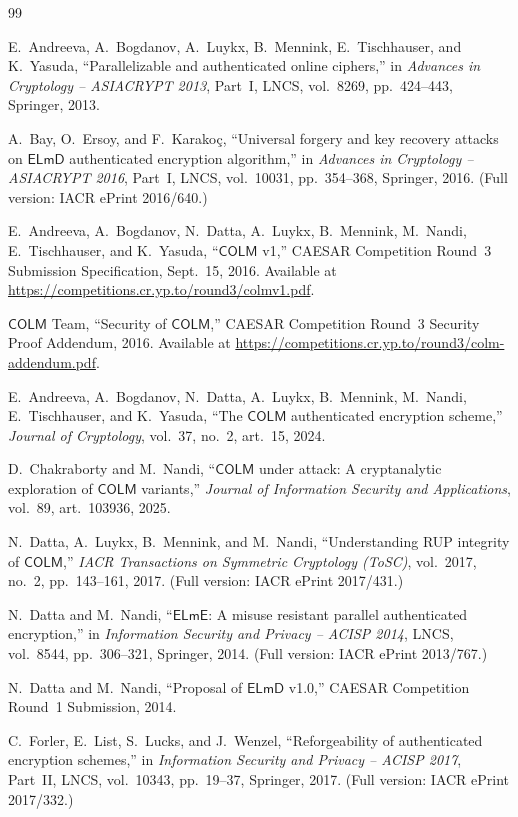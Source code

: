 \documentclass[11pt,a4paper]{article}
\theoremstyle{definition}
\theoremstyle{remark}
\newcommand{\COLM}{\mathsf{COLM}}
\newcommand{\ELmE}{\mathsf{ELmE}}
\newcommand{\ELmD}{\mathsf{ELmD}}
\begin{document}
\begin{thebibliography}{99}

E.~Andreeva, A.~Bogdanov, A.~Luykx, B.~Mennink, E.~Tischhauser, and K.~Yasuda,
``Parallelizable and authenticated online ciphers,'' in \emph{Advances in Cryptology -- ASIACRYPT 2013}, Part~I, LNCS, vol.~8269, pp.~424--443, Springer, 2013.

A.~Bay, O.~Ersoy, and F.~Karako\c{c},
``Universal forgery and key recovery attacks on $\ELmD$ authenticated encryption algorithm,'' in \emph{Advances in Cryptology -- ASIACRYPT 2016}, Part~I, LNCS, vol.~10031, pp.~354--368, Springer, 2016. (Full version: IACR ePrint 2016/640.)

E.~Andreeva, A.~Bogdanov, N.~Datta, A.~Luykx, B.~Mennink, M.~Nandi, E.~Tischhauser, and K.~Yasuda,
``$\COLM$ v1,'' CAESAR Competition Round~3 Submission Specification, Sept.~15, 2016. Available at \url{https://competitions.cr.yp.to/round3/colmv1.pdf}.

$\COLM$ Team,
``Security of $\COLM$,'' CAESAR Competition Round~3 Security Proof Addendum, 2016. Available at \url{https://competitions.cr.yp.to/round3/colm-addendum.pdf}.

E.~Andreeva, A.~Bogdanov, N.~Datta, A.~Luykx, B.~Mennink, M.~Nandi, E.~Tischhauser, and K.~Yasuda,
``The $\COLM$ authenticated encryption scheme,'' \emph{Journal of Cryptology}, vol.~37, no.~2, art.~15, 2024.

D.~Chakraborty and M.~Nandi,
``$\COLM$ under attack: A cryptanalytic exploration of $\COLM$ variants,'' \emph{Journal of Information Security and Applications}, vol.~89, art.~103936, 2025.

N.~Datta, A.~Luykx, B.~Mennink, and M.~Nandi,
``Understanding RUP integrity of $\COLM$,'' \emph{IACR Transactions on Symmetric Cryptology (ToSC)}, vol.~2017, no.~2, pp.~143--161, 2017. (Full version: IACR ePrint 2017/431.)

N.~Datta and M.~Nandi,
``$\ELmE$: A misuse resistant parallel authenticated encryption,'' in \emph{Information Security and Privacy -- ACISP 2014}, LNCS, vol.~8544, pp.~306--321, Springer, 2014. (Full version: IACR ePrint 2013/767.)

N.~Datta and M.~Nandi,
``Proposal of $\ELmD$ v1.0,'' CAESAR Competition Round~1 Submission, 2014.

C.~Forler, E.~List, S.~Lucks, and J.~Wenzel,
``Reforgeability of authenticated encryption schemes,'' in \emph{Information Security and Privacy -- ACISP 2017}, Part~II, LNCS, vol.~10343, pp.~19--37, Springer, 2017. (Full version: IACR ePrint 2017/332.)


\end{thebibliography}
\end{document}
